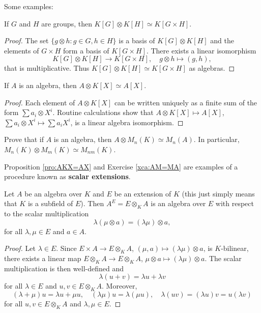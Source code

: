 Some examples:

\begin{proposition}
	If $G$ and $H$ are groups, then $K[G]\otimes K[H]\simeq K[G\times H]$.
\end{proposition}

\begin{proof}
	The set $\{g\otimes h:g\in G,h\in H\}$ is a basis of $K[G]\otimes K[H]$ and 
	the elements of $G\times H$ form a basis of $K[G\times H]$. There exists a linear isomorphism 
	\[
	K[G]\otimes K[H]\to K[G\times H], 
	\quad 
	g\otimes h\mapsto (g,h),
	\]
	that is multiplicative. Thus $K[G]\otimes K[H]\simeq K[G\times H]$
	as algebras. 
\end{proof}

\begin{proposition}
\label{pro:AKX=AX}
	If $A$ is an algebra, then $A\otimes K[X]\simeq A[X]$.	
\end{proposition}

\begin{proof}
	Each element of $A\otimes K[X]$ can be written uniquely as a finite sum of
	the form $\sum a_i\otimes X^i$. Routine calculations show that 
	$A\otimes K[X]\mapsto A[X]$, $\sum a_i\otimes X^i\mapsto \sum a_iX^i$, is a 
	linear algebra isomorphism. 
\end{proof}

\begin{exercise}
\label{xca:AM=MA}
	Prove that if $A$ is an algebra, then $A\otimes M_n(K)\simeq M_n(A)$. In
	particular, $M_n(K)\otimes M_m(K)\simeq M_{nm}(K)$.
\end{exercise}

Proposition \ref{pro:AKX=AX} and Exercise \ref{xca:AM=MA} 
are examples of a procedure known as \textbf{scalar extensions}. 

\begin{theorem}
	Let $A$ be an algebra over $K$ and $E$ be an extension of $K$ (this just simply means that
	$K$ is a subfield of $E$). Then 
	$A^E=E\otimes_KA$ is an algebra over $E$ with respect to
	the scalar multiplication 
	\[
		\lambda(\mu\otimes a)=(\lambda\mu)\otimes a,
	\]
	for all $\lambda,\mu\in E$ and $a\in A$.
\end{theorem}

\begin{proof}
	Let $\lambda\in E$. Since $E\times A\to E\otimes_KA$,
	$(\mu,a)\mapsto (\lambda\mu)\otimes a$, is $K$-bilinear, there exists 
	a linear map $E\otimes_KA\to E\otimes_KA$, $\mu\otimes a\mapsto
	(\lambda\mu)\otimes a$. The scalar multiplication is then well-defined and 
	\[
	\lambda(u+v)=\lambda u+\lambda v
	\]
	for all $\lambda\in E$ and $u,v\in E\otimes_KA$. Moreover, 
	\[
	(\lambda+\mu)u=\lambda u+\mu u,
	\quad
	(\lambda\mu)u=\lambda(\mu u),
	\quad
	\lambda(uv)=(\lambda u)v=u(\lambda v)
	\]
	for all $u,v\in E\otimes_KA$ and $\lambda,\mu\in E$.
\end{proof}

